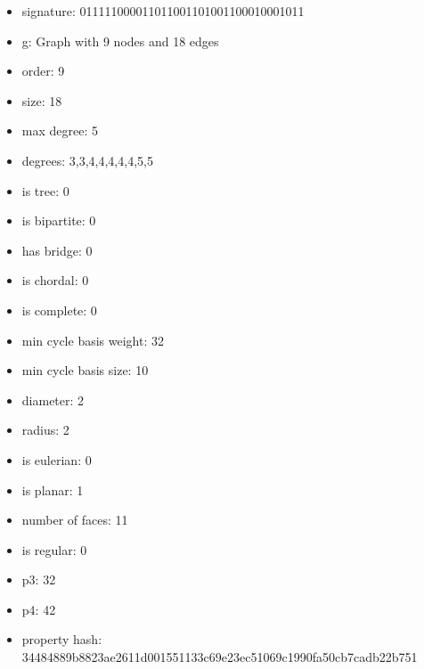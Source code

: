 \newpage
\begin{figure}
\end{figure}
\begin{itemize}
\item signature: 011111000011011001101001100010001011
\item g: Graph with 9 nodes and 18 edges
\item order: 9
\item size: 18
\item max degree: 5
\item degrees: 3,3,4,4,4,4,4,5,5
\item is tree: 0
\item is bipartite: 0
\item has bridge: 0
\item is chordal: 0
\item is complete: 0
\item min cycle basis weight: 32
\item min cycle basis size: 10
\item diameter: 2
\item radius: 2
\item is eulerian: 0
\item is planar: 1
\item number of faces: 11
\item is regular: 0
\item p3: 32
\item p4: 42
\item property hash: 34484889b8823ae2611d001551133c69e23ec51069c1990fa50cb7cadb22b751
\end{itemize}
